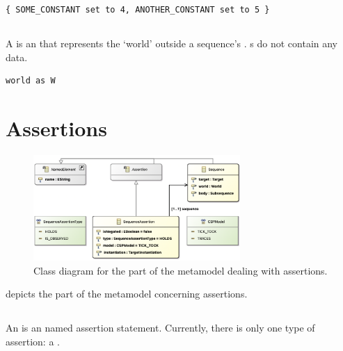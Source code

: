 \begin{lstlisting}[style=Example]
{ SOME_CONSTANT set to 4, ANOTHER_CONSTANT set to 5 }
\end{lstlisting}

\subsection{\mworld}\label{ssec:metamodel-actors-world}

A \mworld{} is an \mactor{} that represents the `world' outside a sequence's
\mtarget.  \mworld s do not contain any data.

\begin{lstlisting}[style=Example]
world as W
\end{lstlisting}


\section{Assertions}\label{sec:metamodel-assertions}

\begin{figure}
	\centering
	\includegraphics[width=0.7\textwidth]{diagrams/assertions.png}
	\caption{Class diagram for the part of the \langname{} metamodel dealing with assertions.}
	\label{fig:metamodel-assertions}
\end{figure}

 depicts the part of the metamodel concerning
assertions.

\subsection{\massertion}

An \massertion{} is an named assertion statement.  Currently, there is
only one type of assertion: a \msequenceassertion{}.  

\subsection{\msequenceassertion}\label{ssec:metamodel-assertions-sequence}

